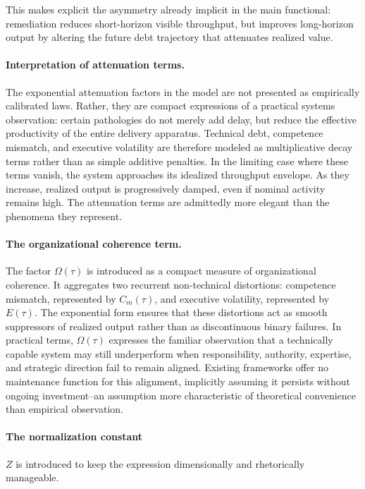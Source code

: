 \documentclass[letterpaper]{article}
\begin{document}
This makes explicit the asymmetry already implicit in the main functional: remediation reduces short-horizon visible throughput, but improves long-horizon output by altering the future debt trajectory that attenuates realized value.


\paragraph{Interpretation of attenuation terms.}
The exponential attenuation factors in the model are not presented as empirically calibrated laws. Rather, they are compact expressions of a practical systems observation: certain pathologies do not merely add delay, but reduce the effective productivity of the entire delivery apparatus. Technical debt, competence mismatch, and executive volatility are therefore modeled as multiplicative decay terms rather than as simple additive penalties. In the limiting case where these terms vanish, the system approaches its idealized throughput envelope. As they increase, realized output is progressively damped, even if nominal activity remains high.
The attenuation terms are admittedly more elegant than the phenomena they represent.


\paragraph{The organizational coherence term.}
The factor $\Omega(\tau)$ is introduced as a compact measure of organizational coherence. It aggregates two recurrent non-technical distortions: competence mismatch, represented by $C_m(\tau)$, and executive volatility, represented by $E(\tau)$. The exponential form ensures that these distortions act as smooth suppressors of realized output rather than as discontinuous binary failures. In practical terms, $\Omega(\tau)$ expresses the familiar observation that a technically capable system may still underperform when responsibility, authority, expertise, and strategic direction fail to remain aligned. Existing frameworks offer no maintenance function for this alignment, implicitly assuming it persists without ongoing investment--an assumption more characteristic of theoretical convenience than empirical observation.

\paragraph{The normalization constant}
$Z$ is introduced to keep the expression dimensionally and rhetorically manageable.
\end{document}
